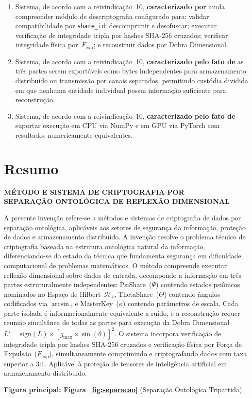 \documentclass[12pt,a4paper]{article}
\newcommand{\Fexp}{F_{\text{exp}}}
\newcommand{\Hfour}{\mathcal{H}_4}
\begin{document}
\begin{enumerate}
\item Sistema, de acordo com a reivindicação~10,
\textbf{caracterizado por} ainda compreender módulo de
descriptografia configurado para: validar compatibilidade por
\texttt{share\_id}; descomprimir e desofuscar; executar
verificação de integridade tripla por hashes SHA-256 cruzados;
verificar integridade física por~$\Fexp$; e reconstruir dados
por Dobra Dimensional.

\item Sistema, de acordo com a reivindicação~10,
\textbf{caracterizado pelo fato de} as três partes serem
exportáveis como bytes independentes para armazenamento
distribuído ou transmissão por canais separados, permitindo
custódia dividida em que nenhuma entidade individual possui
informação suficiente para reconstrução.

\item Sistema, de acordo com a reivindicação~10,
\textbf{caracterizado pelo fato de} suportar execução em CPU
via NumPy e em GPU via PyTorch com resultados numericamente
equivalentes.

\end{enumerate}

\newpage
\section{Resumo}

\begin{center}
{\large\bfseries MÉTODO E SISTEMA DE CRIPTOGRAFIA POR\\
SEPARAÇÃO ONTOLÓGICA DE REFLEXÃO DIMENSIONAL}
\end{center}

\vspace{0.5cm}

A presente invenção refere-se a métodos e sistemas de
criptografia de dados por separação ontológica, aplicáveis aos
setores de segurança da informação, proteção de dados e
armazenamento distribuído. A invenção resolve o problema técnico
de criptografia baseada na estrutura ontológica natural da
informação, diferenciando-se do estado da técnica que fundamenta
segurança em dificuldade computacional de problemas matemáticos.
O método compreende executar reflexão dimensional sobre dados de
entrada, decompondo a informação em três partes estruturalmente
independentes: PsiShare~($\Psi$) contendo estados psiônicos
nominados no Espaço de Hilbert~$\Hfour$, ThetaShare~($\Theta$)
contendo ângulos codificados via $\arcsin$, e
MasterKey~($\kappa$) contendo parâmetros de escala. Cada parte
isolada é informacionalmente equivalente a ruído, e a
reconstrução requer reunião simultânea de todas as partes para
execução da Dobra Dimensional
$L' = \text{sign}(L) \times [g_{\max} \times \sin(\theta)]^2$.
O sistema incorpora verificação de integridade tripla por hashes
SHA-256 cruzados e verificação física por Força de
Expulsão~($\Fexp$), simultaneamente comprimindo e criptografando
dados com taxa superior a 3:1. Aplicável à proteção de tensores
de inteligência artificial em armazenamento distribuído.

\vspace{0.5cm}
\textbf{Figura principal: Figura~\ref{fig:separacao}}
(Separação Ontológica Tripartida)
\end{document}
